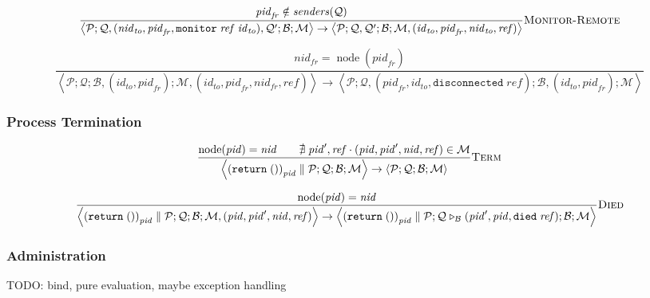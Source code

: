 \documentclass{article}
\newcommand{\sReturn}{\mathtt{return}}
\newcommand{\sMonitor}{\mathtt{monitor}}
\DeclareMathOperator{\sNodeOf}{node}
\newcommand{\sExtend}[1]{\mathrel{\triangleright_{#1}}}
\newcommand{\sPar}{\mathrel{\parallel}}
\newcommand{\sNid}{\ensuremath{\mathit{nid}}}
\newcommand{\sPid}{\ensuremath{\mathit{pid}}}
\newcommand{\sId}{\ensuremath{\mathit{id}}}
\newcommand{\sRef}{\ensuremath{\mathit{ref}}}
\newcommand{\sSystem}[4]{\left\langle #1 ; #2 ; #3 ; #4 \right\rangle}
\newcommand{\sQueue}{\mathcal{Q}}
\newcommand{\sProcesses}{\mathcal{P}}
\newcommand{\sBlacklist}{\mathcal{B}}
\newcommand{\sMonitors}{\mathcal{M}}
\newcommand{\sSenders}{\mathit{senders}}
\begin{document}
\begin{equation*}
\frac{
  \sPid_\mathit{fr} \notin \sSenders(\sQueue)
}{
  \sSystem{\sProcesses}
          {\sQueue, (\sNid_\mathit{to}, \sPid_\mathit{fr}, \sMonitor \; \sRef \; \sId_\mathit{to}), \sQueue'}
          {\sBlacklist}
          {\sMonitors}
\rightarrow          
  \sSystem{\sProcesses}
          {\sQueue, \sQueue'}
          {\sBlacklist}
          {\sMonitors, (\sId_\mathit{to}, \sPid_\mathit{fr}, \sNid_\mathit{to}, \sRef)}
} \textsc{Monitor-Remote}
\end{equation*}

\begin{equation*}
\frac{
  \sNid_\mathit{fr} = \sNodeOf(\sPid_\mathit{fr})
}{
  \sSystem{\sProcesses}
          {\sQueue}
          {\sBlacklist, (\sId_\mathit{to}, \sPid_\mathit{fr})}
          {\sMonitors, (\sId_\mathit{to}, \sPid_\mathit{fr}, \sNid_\mathit{fr}, \sRef)}
\rightarrow          
  \sSystem{\sProcesses}
          {\sQueue, (\sPid_\mathit{fr}, \sId_\mathit{to}, \mathtt{disconnected} \; \sRef)}
          {\sBlacklist, (\sId_\mathit{to}, \sPid_\mathit{fr})}
          {\sMonitors}
}
\end{equation*}

\subsubsection{Process Termination}

\begin{equation*}
\frac{
  \sNodeOf(\sPid) = \sNid
\qquad
  \nexists \; \sPid', \sRef \cdot (\sPid, \sPid', \sNid, \sRef) \in \sMonitors 
}{
  \sSystem{{(\sReturn \; ())}_\sPid \sPar \sProcesses}
          {\sQueue}
          {\sBlacklist}
          {\sMonitors}
\rightarrow          
  \sSystem{\sProcesses}
          {\sQueue}
          {\sBlacklist}
          {\sMonitors}
} \textsc{Term}
\end{equation*}

\begin{equation*}
\frac{
  \sNodeOf(\sPid) = \sNid
}{
  \sSystem{{(\sReturn \; ())}_\sPid \sPar \sProcesses}
          {\sQueue}
          {\sBlacklist}
          {\sMonitors, (\sPid, \sPid', \sNid, \sRef)}
\rightarrow
  \sSystem{{(\sReturn \; ())}_\sPid \sPar \sProcesses}
          {\sQueue \sExtend{\sBlacklist} (\sPid', \sPid, \mathtt{died} \; \sRef)}
          {\sBlacklist}
          {\sMonitors}
} \textsc{Died}
\end{equation*}

\subsubsection{Administration}

TODO: bind, pure evaluation, maybe exception handling
\end{document}
